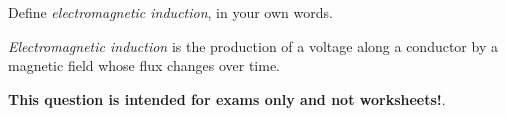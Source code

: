 

Define {\it electromagnetic induction}, in your own words.







{\it Electromagnetic induction} is the production of a voltage along a conductor by a magnetic field whose flux changes over time.







{\bf This question is intended for exams only and not worksheets!}.



